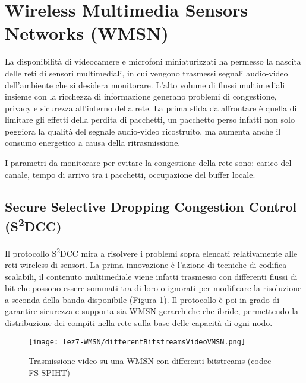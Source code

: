 \section{Wireless Multimedia Sensors Networks (WMSN)}

	La disponibilità di videocamere e microfoni miniaturizzati ha permesso la nascita delle reti di sensori multimediali, in cui vengono trasmessi segnali audio-video dell'ambiente che si desidera monitorare.
	L'alto volume di flussi multimediali insieme con la ricchezza di informazione generano problemi di congestione, privacy e sicurezza all'interno della rete.
	La prima sfida da affrontare è quella di limitare gli effetti della perdita di pacchetti, un pacchetto perso infatti non solo peggiora la qualità del segnale audio-video ricostruito, ma aumenta anche il consumo energetico a causa della ritrasmissione.
	
	I parametri da monitorare per evitare la congestione della rete sono: carico del canale, tempo di arrivo tra i pacchetti, occupazione del buffer locale.
	
	
\subsection{Secure Selective Dropping Congestion Control (S\textsuperscript{2}DCC)}

	Il protocollo S\textsuperscript{2}DCC mira a risolvere i problemi sopra elencati relativamente alle reti wireless di sensori.
	La prima innovazione è l'azione di tecniche di codifica scalabili, il contenuto multimediale viene infatti trasmesso con differenti flussi  di bit che possono essere sommati tra di loro o ignorati per modificare la risoluzione a seconda della banda disponibile (Figura \ref{fig:WMSN-trasmissioneBitstreams}).
	Il protocollo è poi in grado di garantire sicurezza e supporta sia WMSN gerarchiche che ibride, permettendo la distribuzione dei compiti nella rete sulla base delle capacità di ogni nodo.
	
	\begin{figure}[h]
		\centering
		\texttt{[image: lez7-WMSN/differentBitstreamsVideoVMSN.png]}
		\caption{Trasmissione video su una WMSN con differenti bitstreams (codec FS-SPIHT)}
		\label{fig:WMSN-trasmissioneBitstreams}
	\end{figure}

